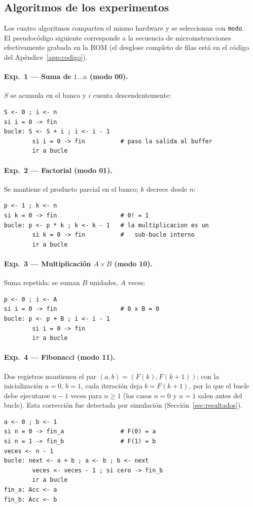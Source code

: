 \documentclass[llncs]{llncs}
\begin{document}
\subsection{Algoritmos de los experimentos}
\label{sec:algoritmos}

Los cuatro algoritmos comparten el mismo hardware y se seleccionan con
\texttt{modo}. El pseudocódigo siguiente corresponde a la secuencia de
microinstrucciones efectivamente grabada en la ROM (el desglose completo
de filas está en el código del Apéndice~\ref{app:codigo}).

\paragraph{Exp.\ 1 --- Suma de $1 \dots n$ (modo 00).}
$S$ se acumula en el banco y $i$ cuenta descendentemente:
\begin{lstlisting}[style=pseudocodigo]
S <- 0 ; i <- n
si i = 0 -> fin
bucle: S <- S + i ; i <- i - 1
        si i = 0 -> fin          # paso la salida al buffer
        ir a bucle
\end{lstlisting}

\paragraph{Exp.\ 2 --- Factorial (modo 01).}
Se mantiene el producto parcial en el banco; $k$ decrece desde $n$:
\begin{lstlisting}[style=pseudocodigo]
p <- 1 ; k <- n
si k = 0 -> fin                  # 0! = 1
bucle: p <- p * k ; k <- k - 1   # la multiplicacion es un
        si k = 0 -> fin          #   sub-bucle interno
        ir a bucle
\end{lstlisting}

\paragraph{Exp.\ 3 --- Multiplicación $A \times B$ (modo 10).}
Suma repetida: se suman $B$ unidades, $A$ veces:
\begin{lstlisting}[style=pseudocodigo]
p <- 0 ; i <- A
si i = 0 -> fin                  # 0 x B = 0
bucle: p <- p + B ; i <- i - 1
        si i = 0 -> fin
        ir a bucle
\end{lstlisting}

\paragraph{Exp.\ 4 --- Fibonacci (modo 11).}
Dos registros mantienen el par $(a, b) = (F(k), F(k+1))$; con la
inicialización $a=0$, $b=1$, cada iteración deja $b = F(k+1)$, por lo
que el bucle debe ejecutarse $n-1$ veces para $n \ge 1$ (los casos
$n=0$ y $n=1$ salen antes del bucle). Esta corrección fue detectada
por simulación (Sección~\ref{sec:resultados}).
\begin{lstlisting}[style=pseudocodigo]
a <- 0 ; b <- 1
si n = 0 -> fin_a                # F(0) = a
si n = 1 -> fin_b                # F(1) = b
veces <- n - 1
bucle: next <- a + b ; a <- b ; b <- next
        veces <- veces - 1 ; si cero -> fin_b
        ir a bucle
fin_a: Acc <- a
fin_b: Acc <- b
\end{lstlisting}
\end{document}
